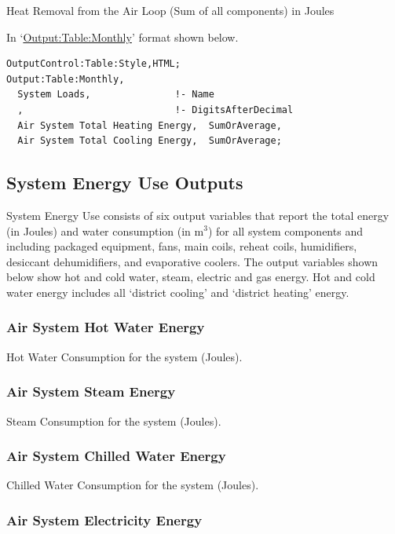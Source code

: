 Heat Removal from the Air Loop (Sum of all components) in Joules

In `\hyperref[outputtablemonthly]{Output:Table:Monthly}' format shown below.

\begin{lstlisting}
OutputControl:Table:Style,HTML;
Output:Table:Monthly,
  System Loads,               !- Name
  ,                           !- DigitsAfterDecimal
  Air System Total Heating Energy,  SumOrAverage,
  Air System Total Cooling Energy,  SumOrAverage;
\end{lstlisting}

\subsection{System Energy Use Outputs}\label{system-energy-use-outputs}

System Energy Use consists of six output variables that report the total energy (in Joules) and water consumption (in m\(^{3}\)) for all system components and including packaged equipment, fans, main coils, reheat coils, humidifiers, desiccant dehumidifiers, and evaporative coolers. The output variables shown below show hot and cold water, steam, electric and gas energy. Hot and cold water energy includes all `district cooling' and `district heating' energy.

\subsubsection{Air System Hot Water Energy}\label{air-system-hot-water-energy}

Hot Water Consumption for the system (Joules).

\subsubsection{Air System Steam Energy}\label{air-system-steam-energy}

Steam Consumption for the system (Joules).

\subsubsection{Air System Chilled Water Energy}\label{air-system-chilled-water-energy}

Chilled Water Consumption for the system (Joules).

\subsubsection{Air System Electricity Energy}\label{air-system-electric-energy}

